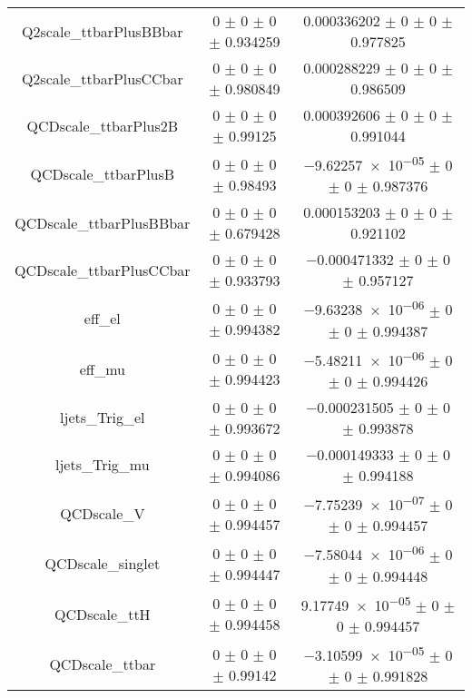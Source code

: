 \begin{table}
\begin{tabular}{ccc}
Q2scale\_ttbarPlusBBbar & \num{0} $\pm$ \num{0} $\pm$ \num{0} $\pm$ \num{0.934259} & \num{0.000336202} $\pm$ \num{0} $\pm$ \num{0} $\pm$ \num{0.977825}\\
Q2scale\_ttbarPlusCCbar & \num{0} $\pm$ \num{0} $\pm$ \num{0} $\pm$ \num{0.980849} & \num{0.000288229} $\pm$ \num{0} $\pm$ \num{0} $\pm$ \num{0.986509}\\
QCDscale\_ttbarPlus2B & \num{0} $\pm$ \num{0} $\pm$ \num{0} $\pm$ \num{0.99125} & \num{0.000392606} $\pm$ \num{0} $\pm$ \num{0} $\pm$ \num{0.991044}\\
QCDscale\_ttbarPlusB & \num{0} $\pm$ \num{0} $\pm$ \num{0} $\pm$ \num{0.98493} & \num{-9.62257e-05} $\pm$ \num{0} $\pm$ \num{0} $\pm$ \num{0.987376}\\
QCDscale\_ttbarPlusBBbar & \num{0} $\pm$ \num{0} $\pm$ \num{0} $\pm$ \num{0.679428} & \num{0.000153203} $\pm$ \num{0} $\pm$ \num{0} $\pm$ \num{0.921102}\\
QCDscale\_ttbarPlusCCbar & \num{0} $\pm$ \num{0} $\pm$ \num{0} $\pm$ \num{0.933793} & \num{-0.000471332} $\pm$ \num{0} $\pm$ \num{0} $\pm$ \num{0.957127}\\
eff\_el & \num{0} $\pm$ \num{0} $\pm$ \num{0} $\pm$ \num{0.994382} & \num{-9.63238e-06} $\pm$ \num{0} $\pm$ \num{0} $\pm$ \num{0.994387}\\
eff\_mu & \num{0} $\pm$ \num{0} $\pm$ \num{0} $\pm$ \num{0.994423} & \num{-5.48211e-06} $\pm$ \num{0} $\pm$ \num{0} $\pm$ \num{0.994426}\\
ljets\_Trig\_el & \num{0} $\pm$ \num{0} $\pm$ \num{0} $\pm$ \num{0.993672} & \num{-0.000231505} $\pm$ \num{0} $\pm$ \num{0} $\pm$ \num{0.993878}\\
ljets\_Trig\_mu & \num{0} $\pm$ \num{0} $\pm$ \num{0} $\pm$ \num{0.994086} & \num{-0.000149333} $\pm$ \num{0} $\pm$ \num{0} $\pm$ \num{0.994188}\\
QCDscale\_V & \num{0} $\pm$ \num{0} $\pm$ \num{0} $\pm$ \num{0.994457} & \num{-7.75239e-07} $\pm$ \num{0} $\pm$ \num{0} $\pm$ \num{0.994457}\\
QCDscale\_singlet & \num{0} $\pm$ \num{0} $\pm$ \num{0} $\pm$ \num{0.994447} & \num{-7.58044e-06} $\pm$ \num{0} $\pm$ \num{0} $\pm$ \num{0.994448}\\
QCDscale\_ttH & \num{0} $\pm$ \num{0} $\pm$ \num{0} $\pm$ \num{0.994458} & \num{9.17749e-05} $\pm$ \num{0} $\pm$ \num{0} $\pm$ \num{0.994457}\\
QCDscale\_ttbar & \num{0} $\pm$ \num{0} $\pm$ \num{0} $\pm$ \num{0.99142} & \num{-3.10599e-05} $\pm$ \num{0} $\pm$ \num{0} $\pm$ \num{0.991828}\\

\end{tabular}
\end{table}
